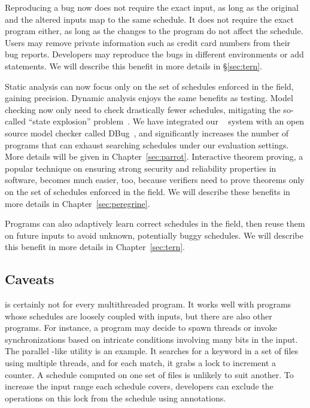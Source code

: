  Reproducing a bug now does not require the exact input,
as long as the original and the altered inputs map to the same schedule.
It does not require the exact program either, as long as the changes to
the program do not affect the schedule.  Users may remove private
information such as credit card numbers from their bug reports. Developers
may reproduce the bugs in different environments or add 
statements. We will describe this benefit in more details in \S\ref{sec:tern}.

 Static analysis can now focus
only on the set of schedules enforced in the field, gaining
precision.  Dynamic analysis enjoys the same benefits as testing.  Model
checking now only need to check drastically fewer schedules, mitigating the
so-called ``state explosion'' problem~\cite{clarke:ModelChecking}. We have
integrated our \parrot~\cite{parrot:sosp13} system with an open source model
checker called DBug~\cite{dbug:spin11}, and \parrot significantly increases the
number of programs that \dbug can exhaust searching schedules under our
evaluation settings. More details will be given in Chapter~\ref{sec:parrot}.
Interactive theorem proving, a popular technique on ensuring strong security and
reliability properties in software, becomes much easier, too, because verifiers
need to prove theorems only on the set of schedules enforced in the field.  We
will describe these benefits in more details in Chapter~\ref{sec:peregrine}.

  Programs can also adaptively learn correct
schedules in the field, then reuse them on future inputs to avoid unknown,
potentially buggy schedules.  We will describe this benefit in more
details in Chapter~\ref{sec:tern}.

\subsection{Caveats}

\smt is certainly not for every multithreaded program.  It works well with
programs whose schedules are loosely coupled with inputs, but there are also
other programs.  For instance, a program may decide to spawn
threads or invoke synchronizations based on intricate conditions involving many
bits in the input. The parallel -like utility \pfscan is an example. 
It
searches for a keyword in a set of files using multiple threads, and for each
match, it grabs a lock to increment a counter.  A schedule computed on one set
of files is unlikely to suit another. To increase the input range each schedule
covers, developers can exclude the operations on this lock from the schedule
using annotations.


